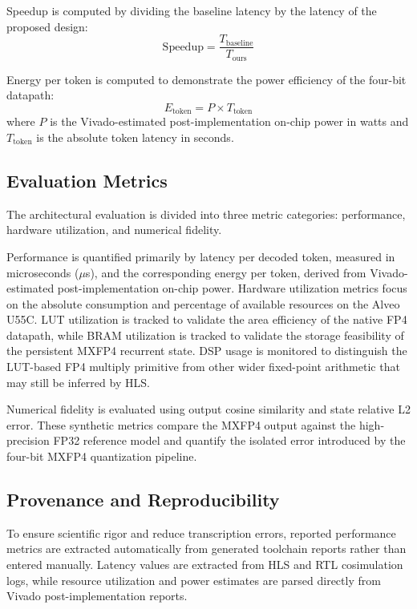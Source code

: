 \documentclass[conference]{IEEEtran}
\begin{document}
Speedup is computed by dividing the baseline latency by the latency of the proposed design:
\begin{equation}
\text{Speedup} = \frac{T_{\text{baseline}}}{T_{\text{ours}}}
\end{equation}

Energy per token is computed to demonstrate the power efficiency of the four-bit datapath:
\begin{equation}
E_{\text{token}} = P \times T_{\text{token}}
\end{equation}
where $P$ is the Vivado-estimated post-implementation on-chip power in watts and $T_{\text{token}}$ is the absolute token latency in seconds.

\subsection{Evaluation Metrics}
The architectural evaluation is divided into three metric categories: performance, hardware utilization, and numerical fidelity.

Performance is quantified primarily by latency per decoded token, measured in microseconds ($\mu$s), and the corresponding energy per token, derived from Vivado-estimated post-implementation on-chip power. Hardware utilization metrics focus on the absolute consumption and percentage of available resources on the Alveo U55C. LUT utilization is tracked to validate the area efficiency of the native FP4 datapath, while BRAM utilization is tracked to validate the storage feasibility of the persistent MXFP4 recurrent state. DSP usage is monitored to distinguish the LUT-based FP4 multiply primitive from other wider fixed-point arithmetic that may still be inferred by HLS.

Numerical fidelity is evaluated using output cosine similarity and state relative L2 error. These synthetic metrics compare the MXFP4 output against the high-precision FP32 reference model and quantify the isolated error introduced by the four-bit MXFP4 quantization pipeline.

\subsection{Provenance and Reproducibility}
To ensure scientific rigor and reduce transcription errors, reported performance metrics are extracted automatically from generated toolchain reports rather than entered manually. Latency values are extracted from HLS and RTL cosimulation logs, while resource utilization and power estimates are parsed directly from Vivado post-implementation reports.
\end{document}
